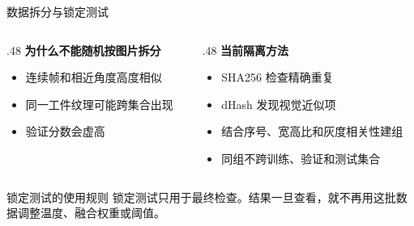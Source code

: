 \documentclass[aspectratio=169,10pt]{beamer}
\begin{document}
\begin{frame}{数据拆分与锁定测试}
  \centering

  \vspace{1em}
  \begin{columns}[T,onlytextwidth]
    \begin{column}{.48\textwidth}
      \textbf{为什么不能随机按图片拆分}
      \begin{itemize}
        \item 连续帧和相近角度高度相似
        \item 同一工件纹理可能跨集合出现
        \item 验证分数会虚高
      \end{itemize}
    \end{column}
    \begin{column}{.48\textwidth}
      \textbf{当前隔离方法}
      \begin{itemize}
        \item SHA256 检查精确重复
        \item dHash 发现视觉近似项
        \item 结合序号、宽高比和灰度相关性建组
        \item 同组不跨训练、验证和测试集合
      \end{itemize}
    \end{column}
  \end{columns}

  \vfill
  \begin{alertblock}{锁定测试的使用规则}
    锁定测试只用于最终检查。结果一旦查看，就不再用这批数据调整温度、融合权重或阈值。
  \end{alertblock}
\end{frame}
\end{document}
